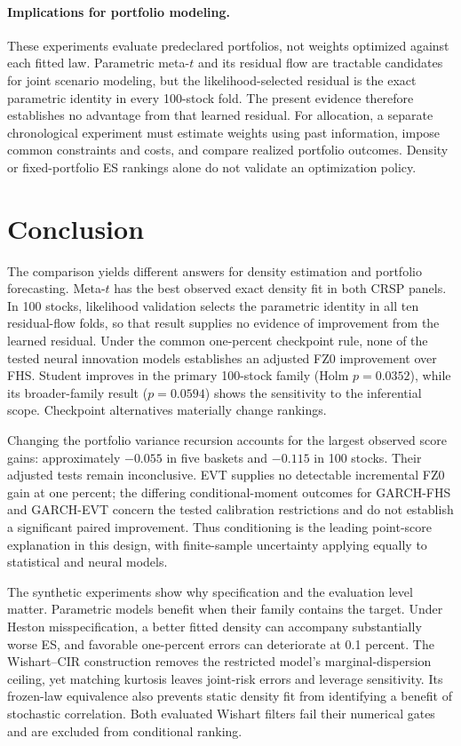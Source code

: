 \documentclass[11pt]{article}
\theoremstyle{definition}\newtheorem{definition}[theorem]{Definition}
\theoremstyle{remark}\newtheorem{remark}[theorem]{Remark}
\begin{document}
\paragraph{Implications for portfolio modeling.}
These experiments evaluate predeclared portfolios, not weights optimized against each fitted law. Parametric meta-$t$ and its residual flow are tractable candidates for joint scenario modeling, but the likelihood-selected residual is the exact parametric identity in every 100-stock fold. The present evidence therefore establishes no advantage from that learned residual. For allocation, a separate chronological experiment must estimate weights using past information, impose common constraints and costs, and compare realized portfolio outcomes. Density or fixed-portfolio ES rankings alone do not validate an optimization policy.

\section{Conclusion}
The comparison yields different answers for density estimation and portfolio forecasting. Meta-$t$ has the best observed exact density fit in both CRSP panels. In 100 stocks, likelihood validation selects the parametric identity in all ten residual-flow folds, so that result supplies no evidence of improvement from the learned residual. Under the common one-percent checkpoint rule, none of the tested neural innovation models establishes an adjusted FZ0 improvement over FHS. Student improves in the primary 100-stock family (Holm $p=0.0352$), while its broader-family result ($p=0.0594$) shows the sensitivity to the inferential scope. Checkpoint alternatives materially change rankings.

Changing the portfolio variance recursion accounts for the largest observed score gains: approximately $-0.055$ in five baskets and $-0.115$ in 100 stocks. Their adjusted tests remain inconclusive. EVT supplies no detectable incremental FZ0 gain at one percent; the differing conditional-moment outcomes for GARCH-FHS and GARCH-EVT concern the tested calibration restrictions and do not establish a significant paired improvement. Thus conditioning is the leading point-score explanation in this design, with finite-sample uncertainty applying equally to statistical and neural models.

The synthetic experiments show why specification and the evaluation level matter. Parametric models benefit when their family contains the target. Under Heston misspecification, a better fitted density can accompany substantially worse ES, and favorable one-percent errors can deteriorate at 0.1 percent. The Wishart--CIR construction removes the restricted model's marginal-dispersion ceiling, yet matching kurtosis leaves joint-risk errors and leverage sensitivity. Its frozen-law equivalence also prevents static density fit from identifying a benefit of stochastic correlation. Both evaluated Wishart filters fail their numerical gates and are excluded from conditional ranking.
\end{document}
